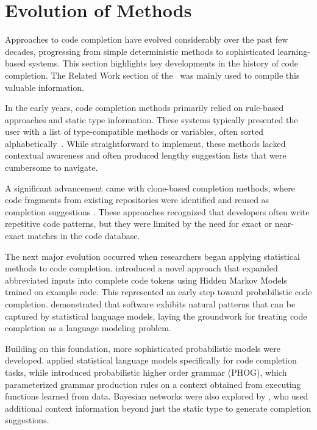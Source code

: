 \section{Evolution of Methods}\label{sec:evolution-of-code-completion}

\begin{sloppypar}
Approaches to code completion have evolved considerably over the past few decades, progressing from simple deterministic methods to sophisticated learning-based systems. This section highlights key developments in the history of code completion. The Related Work section of the~\cite{ciniselli2021} was mainly used to compile this valuable information.
\end{sloppypar}

In the early years, code completion methods primarily relied on rule-based approaches and static type information. These systems typically presented the user with a list of type-compatible methods or variables, often sorted alphabetically~\parencite{mandelin2005}. While straightforward to implement, these methods lacked contextual awareness and often produced lengthy suggestion lists that were cumbersome to navigate.

A significant advancement came with clone-based completion methods, where code fragments from existing repositories were identified and reused as completion suggestions \parencite{hill2004}. These approaches recognized that developers often write repetitive code patterns, but they were limited by the need for exact or near-exact matches in the code database.

The next major evolution occurred when researchers began applying statistical methods to code completion. \citet{han2009} introduced a novel approach that expanded abbreviated inputs into complete code tokens using Hidden Markov Models trained on example code. This represented an early step toward probabilistic code completion. \citet{hindle2012} demonstrated that software exhibits natural patterns that can be captured by statistical language models, laying the groundwork for treating code completion as a language modeling problem.

\begin{sloppypar}
Building on this foundation, more sophisticated probabilistic models were developed. \citet{raychev2014} applied statistical language models specifically for code completion tasks, while \citet{bielik2016} introduced probabilistic higher order grammar (PHOG), which parameterized grammar production rules on a context obtained from executing functions learned from data. Bayesian networks were also explored by \citet{proksch2015}, who used additional context information beyond just the static type to generate completion suggestions.
\end{sloppypar}

